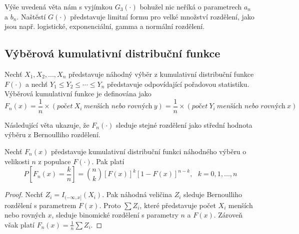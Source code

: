 Výše uvedená věta nám s vyjímkou $G_3(\cdot)$ bohužel nic neříká o parametrech $a_n$ a $b_n$. Naštěstí $G(\cdot)$ představuje limitní formu pro velké množství rozdělení, jako jsou např. logistické, exponenciální, gamma a normální rozdělení.

\subsection{Výběrová kumulativní distribuční funkce}
 
\begin{definition}
Nechť $X_1, X_2, ..., X_n$ představuje náhodný výběr z kumulativní distribuční funkce $F(\cdot)$ a nechť $Y_1 \le Y_2 \le \cdots \le Y_n$ představuje odpovídající pořadovou statistiku. Výběrová kumulativní funkce je definována jako
\begin{equation*}
F_n(x) = \frac{1}{n} \times (\textit{počet}~X_i~\textit{menších nebo rovných}~y) = \frac{1}{n} \times (\textit{počet}~Y_i~\textit{menších nebo rovných}~x)
\end{equation*}
\end{definition}
Následující věta ukazuje, že $F_n(\cdot)$ sleduje stejné rozdělení jako střední hodnota výběru z Bernoulliho rozdělení.
\begin{theorem}
Nechť $F_n(x)$ představuje kumulativní distribuční funkci náhodného výběru o velikosti $n$ z populace $F(\cdot)$. Pak platí
\begin{equation*}
P\left[F_n(x) = \frac{k}{n} \right] = \binom{n}{k}[F(x)]^k[1 - F(x)]^{n - k}, ~~~ k = 0, 1, ..., n
\end{equation*}
\end{theorem}

\begin{proof}
Nechť $Z_i = I_{(-\infty, x]}(X_i)$. Pak náhodná veličina $Z_i$ sleduje Bernoulliho rozdělení s parametrem $F(x)$. Proto $\sum Z_i$, které představuje počet $X_i$ menších nebo rovných $x$, sleduje binomické rozdělení s parametry $n$ a $F(x)$. Zároveň však platí $F_n(x) = \frac{1}{n} \sum Z_i$.
\end{proof}

